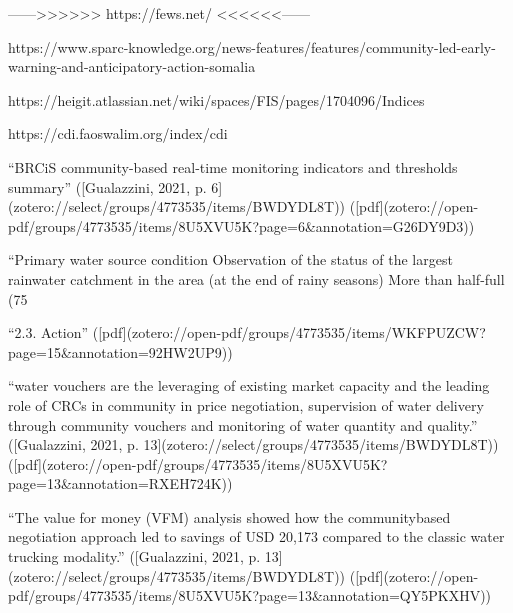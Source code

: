 {------>>>>>> https://fews.net/ <<<<<<------

https://www.sparc-knowledge.org/news-features/features/community-led-early-warning-and-anticipatory-action-somalia

https://heigit.atlassian.net/wiki/spaces/FIS/pages/1704096/Indices

https://cdi.faoswalim.org/index/cdi




“BRCiS community-based real-time monitoring indicators and thresholds summary” ([Gualazzini, 2021, p. 6](zotero://select/groups/4773535/items/BWDYDL8T)) ([pdf](zotero://open-pdf/groups/4773535/items/8U5XVU5K?page=6&annotation=G26DY9D3))

“Primary water source condition Observation of the status of the largest rainwater catchment in the area (at the end of rainy seasons) More than half-full (75%


“2.3. Action” ([pdf](zotero://open-pdf/groups/4773535/items/WKFPUZCW?page=15&annotation=92HW2UP9))

“water vouchers are the leveraging of existing market capacity and the leading role of CRCs in community in price negotiation, supervision of water delivery through community vouchers and monitoring of water quantity and quality.” ([Gualazzini, 2021, p. 13](zotero://select/groups/4773535/items/BWDYDL8T)) ([pdf](zotero://open-pdf/groups/4773535/items/8U5XVU5K?page=13&annotation=RXEH724K))

“The value for money (VFM) analysis showed how the communitybased negotiation approach led to savings of USD 20,173 compared to the classic water trucking modality.” ([Gualazzini, 2021, p. 13](zotero://select/groups/4773535/items/BWDYDL8T)) ([pdf](zotero://open-pdf/groups/4773535/items/8U5XVU5K?page=13&annotation=QY5PKXHV))

}
